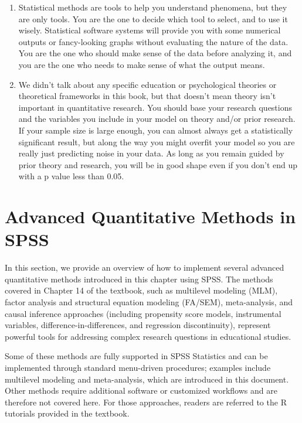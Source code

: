 \documentclass[
  letterpaper,
  DIV=11,
  numbers=noendperiod]{scrreprt}
\begin{document}
\begin{enumerate}
\def\labelenumi{\arabic{enumi}.}
\item
  Statistical methods are tools to help you understand phenomena, but
  they are only tools. You are the one to decide which tool to select,
  and to use it wisely. Statistical software systems will provide you
  with some numerical outputs or fancy-looking graphs without evaluating
  the nature of the data. You are the one who should make sense of the
  data before analyzing it, and you are the one who needs to make sense
  of what the output means.
\item
  We didn't talk about any specific education or psychological theories
  or theoretical frameworks in this book, but that doesn't mean theory
  isn't important in quantitative research. You should base your
  research questions and the variables you include in your model on
  theory and/or prior research. If your sample size is large enough, you
  can almost always get a statistically significant result, but along
  the way you might overfit your model so you are really just predicting
  noise in your data. As long as you remain guided by prior theory and
  research, you will be in good shape even if you don't end up with a p
  value less than 0.05.
\end{enumerate}


\chapter*{Advanced Quantitative Methods in
SPSS}\label{advanced-quantitative-methods-in-spss}


In this section, we provide an overview of how to implement several
advanced quantitative methods introduced in this chapter using SPSS. The
methods covered in Chapter 14 of the textbook, such as multilevel
modeling (MLM), factor analysis and structural equation modeling
(FA/SEM), meta-analysis, and causal inference approaches (including
propensity score models, instrumental variables,
difference-in-differences, and regression discontinuity), represent
powerful tools for addressing complex research questions in educational
studies.

Some of these methods are fully supported in SPSS Statistics and can be
implemented through standard menu-driven procedures; examples include
multilevel modeling and meta-analysis, which are introduced in this
document. Other methods require additional software or customized
workflows and are therefore not covered here. For those approaches,
readers are referred to the R tutorials provided in the textbook.
\end{document}
